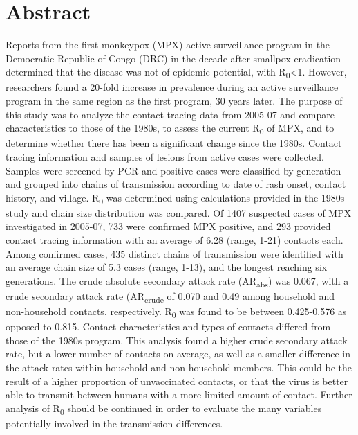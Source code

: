 \section{Abstract}

Reports from the first monkeypox (MPX) active surveillance program in the Democratic Republic of Congo (DRC) in the decade after smallpox eradication determined that the disease was not of epidemic potential, with R\textsubscript{0}\textless1. However, researchers found a 20-fold increase in prevalence during an active surveillance program in the same region as the first program, 30 years later. The purpose of this study was to analyze the contact tracing data from 2005-07 and compare characteristics to those of the 1980s, to assess the current R\textsubscript{0} of MPX, and to determine whether there has been a significant change since the 1980s. Contact tracing information and samples of lesions from active cases were collected. Samples were screened by PCR and positive cases were classified by generation and grouped into chains of transmission according to date of rash onset, contact history, and village. R\textsubscript{0} was determined using calculations provided in the 1980s study and chain size distribution was compared. Of 1407 suspected cases of MPX investigated in 2005-07, 733 were confirmed MPX positive, and 293 provided contact tracing information with an average of 6.28 (range, 1-21) contacts each. Among confirmed cases, 435 distinct chains of transmission were identified with an average chain size of 5.3 cases (range, 1-13), and the longest reaching six generations. The crude absolute secondary attack rate (AR\textsubscript{abs}) was 0.067, with a crude secondary attack rate (AR\textsubscript{crude} of 0.070 and 0.49 among household and non-household contacts, respectively. R\textsubscript{0} was found to be between 0.425-0.576 as opposed to 0.815. Contact characteristics and types of contacts differed from those of the 1980s program. This analysis found a higher crude secondary attack rate, but a lower number of contacts on average, as well as a smaller difference in the attack rates within household and non-household members. This could be the result of a higher proportion of unvaccinated contacts, or that the virus is better able to transmit between humans with a more limited amount of contact. Further analysis of R\textsubscript{0} should be continued in order to evaluate the many variables potentially involved in the transmission differences. 
